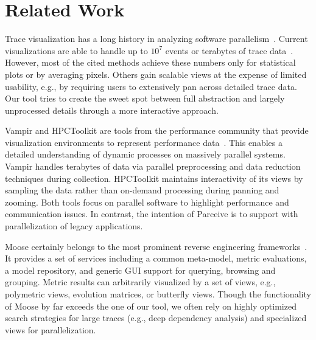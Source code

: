 \section{Related Work}
\label{sec:related_work}
Trace visualization has a long history in analyzing software
parallelism~\cite{TraceVisualization}. Current visualizations are able to
handle up to $10^7$ events or terabytes of trace data~\cite{State}. However,
most of the cited methods achieve these numbers only for statistical plots or
by averaging pixels. Others gain scalable views at the expense of limited
usability, e.g., by requiring users to extensively pan across detailed trace
data. Our tool tries to create the sweet spot between full abstraction and
largely unprocessed details through a more interactive approach.

Vampir and HPCToolkit are tools from the performance community that provide
visualization environments to represent performance data~\cite{Vampir,
HPCToolkit}. This enables a detailed understanding of dynamic processes on
massively parallel systems. Vampir handles terabytes of data via parallel
preprocessing and data reduction techniques during collection. HPCToolkit
maintains interactivity of its views by sampling the data rather than on-demand
processing during panning and zooming. Both tools focus on parallel software to
highlight performance and communication issues. In contrast, the intention of
Parceive is to support with parallelization of legacy applications.

Moose certainly belongs to the most prominent reverse engineering
frameworks~\cite{Moose}. It provides a set of services including a common
meta-model, metric evaluations, a model repository, and generic GUI support for
querying, browsing and grouping. Metric results can arbitrarily visualized by a
set of views, e.g., polymetric views, evolution matrices, or butterfly views.
Though the functionality of Moose by far exceeds the one of our tool, we often
rely on highly optimized search strategies for large traces (e.g., deep
dependency analysis) and specialized views for parallelization.